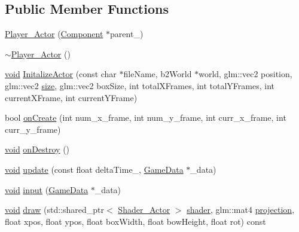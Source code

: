 \subsection*{Public Member Functions}
\begin{DoxyCompactItemize}
\item 
\hyperlink{classPlayer__Actor_a1aef0ea6306d89fa9d1d429d5f81e552}{Player\+\_\+\+Actor} (\hyperlink{classComponent}{Component} $\ast$parent\+\_\+)
\item 
\hyperlink{classPlayer__Actor_a193e44011788a5b22381bd4f9c979a19}{$\sim$\+Player\+\_\+\+Actor} ()
\item 
\hyperlink{imgui__impl__opengl3__loader_8h_ac668e7cffd9e2e9cfee428b9b2f34fa7}{void} \hyperlink{classPlayer__Actor_a9bac2f7e839d7bb548f1cb06a27a4652}{Initalize\+Actor} (const char $\ast$file\+Name, b2\+World $\ast$world, glm\+::vec2 position, glm\+::vec2 \hyperlink{imgui__impl__opengl3__loader_8h_a3d1e3edfcf61ca2d831883e1afbad89e}{size}, glm\+::vec2 box\+Size, int total\+X\+Frames, int total\+Y\+Frames, int current\+X\+Frame, int current\+Y\+Frame)
\item 
bool \hyperlink{classPlayer__Actor_a4085daf8f3785fbf3934631e66ce7533}{on\+Create} (int num\+\_\+x\+\_\+frame, int num\+\_\+y\+\_\+frame, int curr\+\_\+x\+\_\+frame, int curr\+\_\+y\+\_\+frame)
\item 
\hyperlink{imgui__impl__opengl3__loader_8h_ac668e7cffd9e2e9cfee428b9b2f34fa7}{void} \hyperlink{classPlayer__Actor_a200b6b956d9c597cbc626ca9bcafb25e}{on\+Destroy} ()
\item 
\hyperlink{imgui__impl__opengl3__loader_8h_ac668e7cffd9e2e9cfee428b9b2f34fa7}{void} \hyperlink{classPlayer__Actor_a51ebc41b60f1a296c7677e50d69df60d}{update} (const float delta\+Time\+\_\+, \hyperlink{structGameData}{Game\+Data} $\ast$\+\_\+data)
\item 
\hyperlink{imgui__impl__opengl3__loader_8h_ac668e7cffd9e2e9cfee428b9b2f34fa7}{void} \hyperlink{classPlayer__Actor_a895c8c3db6763ad42d4c518987e2e543}{input} (\hyperlink{structGameData}{Game\+Data} $\ast$\+\_\+data)
\item 
\hyperlink{imgui__impl__opengl3__loader_8h_ac668e7cffd9e2e9cfee428b9b2f34fa7}{void} \hyperlink{classPlayer__Actor_a832baa3e201dea536546a9faca8fd952}{draw} (std\+::shared\+\_\+ptr$<$ \hyperlink{classShader__Actor}{Shader\+\_\+\+Actor} $>$ \hyperlink{imgui__impl__opengl3__loader_8h_a57b2a96adb1d51204909a82d861e395e}{shader}, glm\+::mat4 \hyperlink{main__menu__state_8cpp_a565d92bfbcc4a481d2d35f3850a382f7}{projection}, float xpos, float ypos, float box\+Width, float bow\+Height, float rot) const

\end{DoxyCompactItemize}
